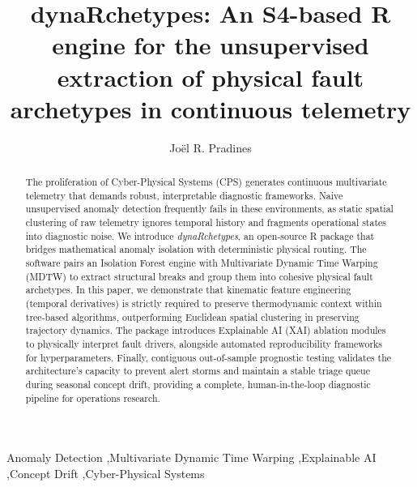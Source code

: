 \documentclass[final,3p,times]{elsarticle}
\begin{document}
\begin{frontmatter}

\title{dynaRchetypes: An S4-based R engine for the unsupervised extraction of physical fault archetypes in continuous telemetry}

\author[1]{Jo\"{e}l R. Pradines}
\address[1]{[Insert Affiliation/Institution Here]}

\begin{abstract}
The proliferation of Cyber-Physical Systems (CPS) generates continuous multivariate telemetry that demands robust, interpretable diagnostic frameworks. Naive unsupervised anomaly detection frequently fails in these environments, as static spatial clustering of raw telemetry ignores temporal history and fragments operational states into diagnostic noise. We introduce \textit{dynaRchetypes}, an open-source R package that bridges mathematical anomaly isolation with deterministic physical routing. The software pairs an Isolation Forest engine with Multivariate Dynamic Time Warping (MDTW) to extract structural breaks and group them into cohesive physical fault archetypes. In this paper, we demonstrate that kinematic feature engineering (temporal derivatives) is strictly required to preserve thermodynamic context within tree-based algorithms, outperforming Euclidean spatial clustering in preserving trajectory dynamics. The package introduces Explainable AI (XAI) ablation modules to physically interpret fault drivers, alongside automated reproducibility frameworks for hyperparameters. Finally, contiguous out-of-sample prognostic testing validates the architecture's capacity to prevent alert storms and maintain a stable triage queue during seasonal concept drift, providing a complete, human-in-the-loop diagnostic pipeline for operations research.
\end{abstract}

\begin{keyword}
Anomaly Detection \sep Multivariate Dynamic Time Warping \sep Explainable AI \sep Concept Drift \sep Cyber-Physical Systems
\end{keyword}

\end{frontmatter}
\end{document}
